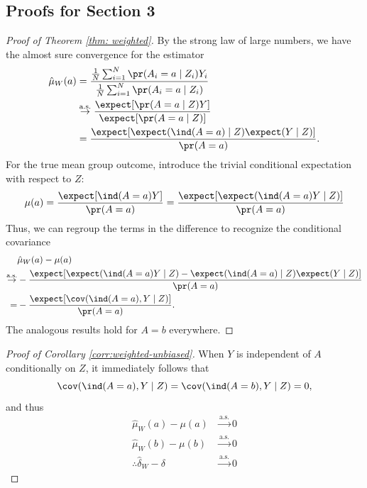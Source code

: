 \begin{appendices}
  \section{Proofs for Section 3}

\begin{proof}[Proof of Theorem \ref{thm: weighted}]
By the strong law of large numbers, we have the almost sure convergence for the estimator
\begin{align*}
    \hat{\mu}_{W}(a) &=  \frac{\frac{1}{N}\sum_{i = 1}^N \pr(A_i = a \mid Z_i)Y_i}{\frac{1}{N}\sum_{i = 1}^N \pr(A_i = a \mid Z_i)} \\
    &\overset{\text{a.s.}}{\to} \frac{\expect [\pr (A = a \mid Z)Y]}{\expect [\pr (A = a \mid Z)]} \\
    &= \frac{\expect [\expect (\ind (A = a) \mid Z) \expect (Y \mid Z)]}{\pr (A = a)}.
\end{align*}
For the true mean group outcome, introduce the trivial conditional expectation with respect to $Z$:
\begin{align*}
    \mu(a) = \frac{\expect[\ind (A = a)Y]}{\pr (A = a)} = \frac{\expect [\expect (\ind (A = a)Y \mid Z)]}{\pr (A = a)}
\end{align*}
Thus, we can regroup the terms in the difference to recognize the conditional covariance
\begin{align*}
    &\hat{\mu}_{W}(a) - \mu(a) \\
    \overset{\text{a.s.}}{\to} &-\frac{\expect [\expect (\ind (A = a)Y \mid Z) - \expect (\ind (A = a) \mid Z) \expect(Y \mid Z)]}{\pr (A = a)} \\
    = & -\frac{\expect [\cov (\ind(A = a), Y \mid Z)]}{\pr (A = a)}.
\end{align*}
The analogous results hold for $A=b$ everywhere.
\end{proof}

\begin{proof}[Proof of Corollary \ref{corr:weighted-unbiased}]
When $Y$ is independent of $A$ conditionally on $Z$, it immediately follows that
\[
\cov (\ind(A = a), Y \mid Z) = \cov (\ind(A = b), Y \mid Z) = 0,
\]
and thus
\begin{align*}
    \hat{\mu}_{W}(a) - \mu(a) &\overset{\text{a.s.}}{\to} 0\\
    \hat{\mu}_{W}(b) - \mu(b) &\overset{\text{a.s.}}{\to} 0 \\
\therefore \hat{\delta}_{W} - \delta &\overset{\text{a.s.}}{\to} 0
\end{align*}
\end{proof}


\end{appendices}
